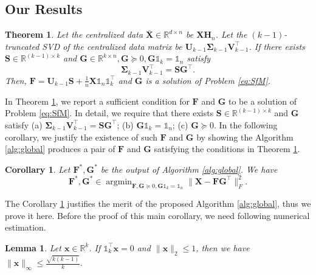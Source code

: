 \documentclass[journal]{IEEEtran}
\begin{document}
\subsection{Our Results}\label{sec:mainRes}
\newtheorem{thm}{\bf Theorem}
\begin{thm}\label{thm:mainRes}
	Let the centralized data $\overline{\mathbf{X}} \in\mathbb{R}^{d\times n}$ be $\mathbf{X}\mathbf{H}_n$.
	Let the $(k-1)$-truncated SVD of the centralized data matrix be $\mathbf{U}_{k-1}\mathbf{\Sigma}_{k-1}\mathbf{V}_{k-1}^\top$. 
	If there exists $\mathbf{S}\in\mathbb{R}^{(k-1)\times k}$ and $\mathbf{G}\in\mathbb{R}^{k\times n}, \mathbf{G}\succeq 0, \mathbf{G}\mathbb{1}_k = \mathbb{1}_n$ satisfy
	\[
	\mathbf{\Sigma}_{k-1}\mathbf{V}_{k-1}^\top = \mathbf{S}\mathbf{G}^\top.
	\]
	Then, $\mathbf{F}=\mathbf{U}_{k-1}\mathbf{S} + \frac{1}{n}\mathbf{X}\mathbb{1}_n\mathbb{1}_k^\top$ and $\mathbf{G}$ is a solution of Problem \eqref{eq:SfM}.
\end{thm}

\begin{remark}
	In Theorem \ref{thm:mainRes}, we report a sufficient condition for $\mathbf{F}$ and $\mathbf{G}$ to be a solution of Problem \eqref{eq:SfM}.
	In detail, we require that there exists $\mathbf{S}\in\mathbb{R}^{(k-1)\times k}$ and $\mathbf{G}$ satisfy (a) $\mathbf{\Sigma}_{k-1}\mathbf{V}_{k-1}^\top = \mathbf{S}\mathbf{G}^\top$; (b) $\mathbf{G}\mathbb{1}_k = \mathbb{1}_n$; (c) $\mathbf{G} \succeq 0$.
	In the following corollary, we justify the existence of such $\mathbf{F}$ and $\mathbf{G}$ by showing the Algorithm \ref{alg:global} produces
	a pair of $\mathbf{F}$ and $\mathbf{G}$ satisfying the conditions in Theorem \ref{thm:mainRes}.
\end{remark}

\newtheorem{corollary}{\bf Corollary}
\begin{corollary}\label{thm:mainCorollary}
	Let $\mathbf{F}^*, \mathbf{G}^*$ be the output of Algorithm \ref{alg:global}. We have
	\[
	\mathbf{F}^*, \mathbf{G}^* \in \mathop{\arg\min}_{\mathbf{F},\mathbf{G}\succeq 0,\mathbf{G}\mathbb{1}_k = \mathbb{1}_n} \| \mathbf{X} - \mathbf{FG}^\top\|_F^2.
	\]
\end{corollary}

The Corollary \ref{thm:mainCorollary} justifies the merit of the proposed Algorithm \ref{alg:global}, thus we prove it here. Before the proof of this main corollary, we need following numerical estimation.
\newtheorem{Lemma1}{\bf Lemma}
\begin{Lemma1}\label{lem:numerical}
	Let $\mathbf{x} \in \mathbb{R}^k$.
	If $\mathbb{1}_k^\top\mathbf{x}=0$ and $\|\mathbf{x}\|_2 \leq 1$, then we have $\|\mathbf{x}\|_\infty \leq \frac{\sqrt{k(k-1)}}{k}.$
\end{Lemma1}
\end{document}
